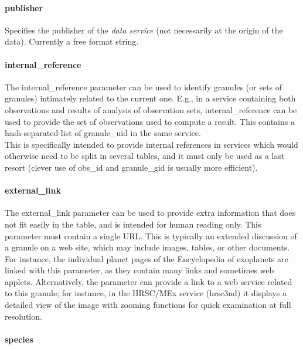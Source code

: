 \documentclass[11pt,a4paper]{ivoa}
\begin{document}
\paragraph{publisher}

Specifies the publisher of the \emph{data service} (not necessarily at the origin of the data). Currently a free format string.\\

\paragraph{internal\_reference}

The internal\_reference parameter can be used to identify granules (or sets of granules) intimately related to the current one. E.g., in a service containing both observations and results of analysis of observation sets, internal\_reference can be used to provide the set of observations used to compute a result. This contains a hash-separated-list of granule\_uid in the same service.\\This is specifically intended to provide internal references in services which would otherwise need to be split in several tables, and it must only be used as a last resort (clever use of obs\_id and granule\_gid is usually more efficient).

\paragraph{external\_link}

The external\_link parameter can be used to provide extra information that does not fit easily in the table, and is intended for human reading only. This parameter must contain a single URL. This is typically an extended discussion of a granule on a web site, which may include images, tables, or other documents. For instance, the individual planet pages of the Encyclopedia of exoplanets are linked with this parameter, as they contain many links and sometimes web applets. Alternatively, the parameter can provide a link to a web service related to this granule; for instance, in the HRSC/MEx service (hrsc3nd) it displays a detailed view of the image with zooming functions for quick examination at full resolution.\\

\paragraph{species}
\end{document}
